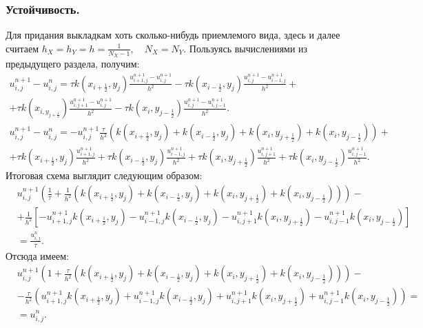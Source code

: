 \documentclass[14pt,a4paper]{extarticle}
\newcommand{\1}{\mathbbm{1}}
\begin{document}
\subsubsection{Устойчивость.}
Для придания выкладкам хоть сколько-нибудь приемлемого вида, здесь и далее считаем $h_X = h_Y = h = \frac{1}{N_X - 1}, \quad N_X = N_Y$.
Пользуясь вычислениями из предыдущего раздела, получим:
\begin{align*}
    u^{n+1}_{i, j} - u^n_{i, j} = \tau k(x_{i + \frac{1}{2}}, y_j) \frac{u^{n+1}_{i+1, j} - u^{n+1}_{i, j}}{h^2} - \tau k(x_{i- \frac{1}{2}}, y_j) \frac{u^{n+1}_{i, j} - u^{n+1}_{i-1, j}}{h^2} + \\
    + \tau k(x_{i, y_{j + \frac{1}{2}}}) \frac{u^{n+1}_{i, j+1} - u^{n+1}_{i, j}}{h^2} - \tau k(x_{i}, y_{j - \frac{1}{2}}) \frac{u^{n+1}_{i, j} - u^{n+1}_{i, j-1}}{h^2}. \\
    u^{n+1}_{i, j} - u^n_{i, j} = - u^{n+1}_{i, j} \frac{\tau}{h^2} \left(k(x_{i + \frac{1}{2}}, y_{j}) + k(x_{i - \frac{1}{2}}, y_{j}) + k(x_{i}, y_{j+ \frac{1}{2}}) + k(x_{i}, y_{j- \frac{1}{2}})\right) +\\
    + \tau k(x_{i + \frac{1}{2}}, y_{j}) \frac{u^{n+1}_{i+1,j} }{h^2} 
    + \tau k(x_{i- \frac{1}{2}}, y_{j}) \frac{u^{n+1}_{i-1, j}}{h^2}
    + \tau k(x_{i}, y_{j+ \frac{1}{2}}) \frac{u^{n+1}_{i,j+1} }{h^2} 
    + \tau k(x_{i}, y_{j- \frac{1}{2}}) \frac{u^{n+1}_{i, j-1}}{h^2}. 
\end{align*}
Итоговая схема выглядит следующим образом:
\begin{align*}
    &u^{n+1}_{i, j}\left(\frac{1}{\tau} + \frac{1}{h^2} \left(k(x_{i + \frac{1}{2}}, y_{j}) + k(x_{i - \frac{1}{2}}, y_{j}) + k(x_{i}, y_{j+ \frac{1}{2}}) + k(x_{i}, y_{j- \frac{1}{2}})\right)\right) -\\
    &+ \frac{1}{h^2} \left[- u^{n+1}_{i+1,j} k(x_{i + \frac{1}{2}}, y_{j}) 
    - u^{n+1}_{i-1, j} k(x_{i- \frac{1}{2}}, y_{j})
    - u^{n+1}_{i,j+1} k(x_{i}, y_{j+ \frac{1}{2}}) 
    - u^{n+1}_{i, j-1} k(x_{i}, y_{j- \frac{1}{2}}) \right]\\ &= \frac{u^n_{i, j}}{\tau}.
\end{align*}
Отсюда имеем:
\begin{align*}
    &u^{n+1}_{i, j} \left(1 + \frac{\tau}{h^2} 
    \left(
        k(x_{i + \frac{1}{2}}, y_{j}) +
        k(x_{i- \frac{1}{2}}, y_{j}) +
        k(x_{i}, y_{j+ \frac{1}{2}}) +
        k(x_{i}, y_{j- \frac{1}{2}})
    \right)\right) - \\
    &- \frac{\tau}{h^2} \left(
      u^{n+1}_{i+1,j} k(x_{i + \frac{1}{2}}, y_{j}) 
    + u^{n+1}_{i-1, j} k(x_{i- \frac{1}{2}}, y_{j})
    + u^{n+1}_{i,j+1} k(x_{i}, y_{j+ \frac{1}{2}}) 
    + u^{n+1}_{i, j-1} k(x_{i}, y_{j- \frac{1}{2}})\right) = \\ 
    &= u^{n}_{i, j}. 
\end{align*}
\end{document}
